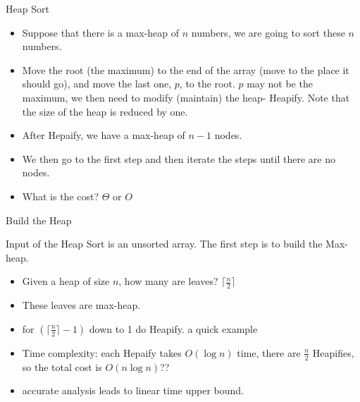 \documentclass{beamer}
\begin{document}
\begin{frame}{}
\begin{center}
Heap Sort
\end{center}
\begin{itemize}
\item Suppose that there is a max-heap of $n$ numbers, we are going to sort these
 $n$ numbers.  
\item Move the root (the maximum) to the end of the array
 (move to the place it should go),
 and move the last one, $p$, to the root.  $p$ may not be the maximum, we 
 then need to modify (maintain) the heap- {\sc Heapify}.  
 Note that the size of the
 heap is reduced by one.  
\end{itemize}
\end{frame}

\begin{frame}{}
\begin{itemize}
\item After {\sc Hepaify}, we have a max-heap of $n-1$ nodes.  
\item We then go to the first step and then iterate the steps until
 there are no nodes.  
\item What is the cost? $\Theta$ or $O$
\end{itemize}
\end{frame}

\begin{frame}{}
\begin{center}
Build the Heap
\end{center}
Input of the Heap Sort is an unsorted array.  The first step is to build the
Max-heap. 
\begin{itemize}
\item { Given a heap of size $n$, how many are leaves? 
 $\lceil\frac{n}{2}\rceil$}
\item {\small These leaves are max-heap.}  
\item {\small for $(\lceil \frac{n}{2}\rceil-1)$ down to 1 do {\sc Heapify}.  
 {\small a quick example}}
\item {\small Time complexity: each Hepaify takes $O(\log n)$ time, there are 
 $\frac{n}{2}$ {\sc Heapifies}, so the total cost is $O(n \log n)$??}
\item {\small accurate analysis leads to linear time upper bound.}  
\end{itemize}
\end{frame}
\end{document}
